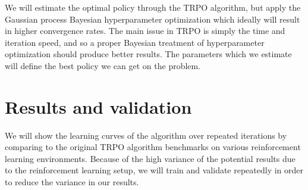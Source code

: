 \documentclass[twoside]{article}
\begin{document}

We will estimate the optimal policy through the TRPO algorithm, but apply the Gaussian process Bayesian hyperparameter optimization which ideally will result in higher convergence rates. The main issue in TRPO is simply the time and iteration speed, and so a proper Bayesian treatment of hyperparameter optimization should produce better results. The parameters which we estimate will define the best policy we can get on the problem.

\section{Results and validation}


We will show the learning curves of the algorithm over repeated iterations by comparing to the original TRPO algorithm benchmarks on various reinforcement learning environments. Because of the high variance of the potential results due to the reinforcement learning setup, we will train and validate repeatedly in order to reduce the variance in our results.

\end{document}
